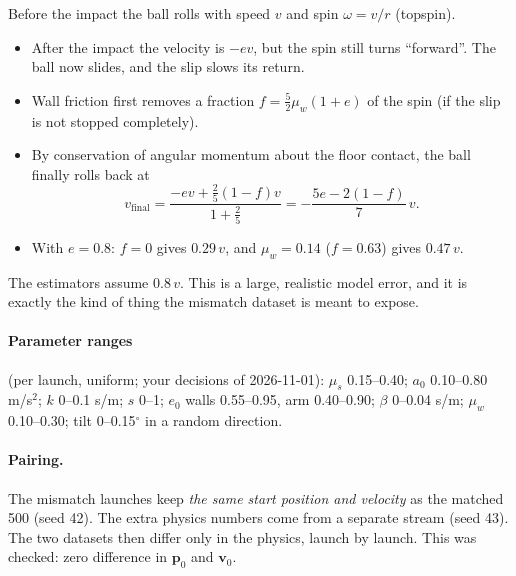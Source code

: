\documentclass[11pt,a4paper]{article}
\newcommand{\vv}{\bm v}\newcommand{\pp}{\bm p}\newcommand{\uu}{\bm u}
\begin{document}
\begin{example}
Before the impact the ball rolls with speed $v$ and spin $\omega=v/r$ (topspin).
\begin{itemize}
\item After the impact the velocity is $-e v$, but the spin still turns ``forward''. The ball now slides, and the slip
  slows its return.
\item Wall friction first removes a fraction $f=\frac52\mu_w(1+e)$ of the spin (if the slip is not stopped completely).
\item By conservation of angular momentum about the floor contact, the ball finally rolls back at
\[ v_{\text{final}} = \frac{-e v + \frac25(1-f)v}{1+\frac25} = -\frac{5e-2(1-f)}{7}\,v. \]
\item With $e=0.8$: $f=0$ gives $0.29\,v$, and $\mu_w=0.14$ ($f=0.63$) gives $0.47\,v$.
\end{itemize}
The estimators assume $0.8\,v$. This is a large, realistic model error, and it is exactly the kind of thing the
mismatch dataset is meant to expose.
\end{example}

\paragraph{Parameter ranges} (per launch, uniform; your decisions of 2026-11-01): $\mu_s$ 0.15--0.40; $a_0$ 0.10--0.80
m/s$^2$; $k$ 0--0.1 s/m; $s$ 0--1; $e_0$ walls 0.55--0.95, arm 0.40--0.90; $\beta$ 0--0.04 s/m; $\mu_w$ 0.10--0.30;
tilt 0--0.15$^\circ$ in a random direction.

\paragraph{Pairing.} The mismatch launches keep \emph{the same start position and velocity} as the matched 500 (seed
42). The extra physics numbers come from a separate stream (seed 43). The two datasets then differ only in the physics,
launch by launch. This was checked: zero difference in $\pp_0$ and $\vv_0$.
\end{document}
